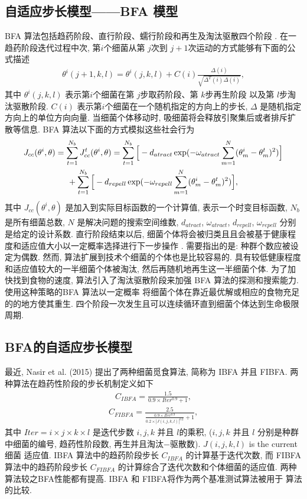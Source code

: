 \subsection{自适应步长模型——BFA 模型}\label{TPMsec1}
    BFA 算法包括趋药阶段、直行阶段、蠕行阶段和再生及淘汰驱散四个阶段 .
    在一趋药阶段迭代过程中次, 第$i$个细菌从第 $j$次到  $j+1$次运动的方式能够有下面的公式描述
\begin{align}\label{AdapchemCI}
    \theta^{i}(j+1,k,l)=\theta^{i}(j,k,l)+C(i)\frac{\Delta(i)}{\sqrt{\Delta^{T}(i)\Delta(i)}},
\end{align}
其中 $\theta^{i}(j,k,l)$ 表示第$i$个细菌在第 $j$步取药阶段、第 $k$步再生阶段 以及第 $l$步淘汰驱散阶段.
$C(i)$ 表示第$i$个细菌在一个随机指定的方向上的步长, $\Delta$ 是随机指定方向上的单位方向向量. 当细菌个体移动时, 吸细菌将会释放引聚集后或者排斥扩散等信息. BFA 算法以下面的方式模拟这些社会行为
\begin{align}
    J_{cc}&(\theta^{i}, \theta)=\sum_{t=1}^{N_b}J_{cc}^{t}(\theta^{i},\theta)
            = \sum_{t=1}^{N_b}\Big[-d_{atract}\exp(-\omega_{atract}\sum_{m=1}^{N}(\theta_{m}^{i}-\theta_{m}^{t})^2)\Big]\notag \\
&\qquad\qquad+\sum_{t=1}^{N_b}\Big[-d_{repell}\exp(-\omega_{repell}\sum_{m=1}^{N}(\theta_{m}^{i}-\theta_{m}^{t})^2)\Big],
\end{align}
其中 $J_{cc}(\theta^i,\theta)$ 是加入到实际目标函数的一个计算值, 表示一个时变目标函数, $N_b$ 是所有细菌总数, $N$ 是解决问题的搜索空间维数, $d_{atract}$, $\omega_{atract}$, $d_{repell}$, $\omega_{repell}$ 分别是给定的设计系数.
直行阶段结束以后, 细菌个体将会被归类且且会被基于健康程度和适应值大小以一定概率选择进行下一步操作 .
需要指出的是: 种群个数应被设定为偶数. 然而, 算法扩展到技术个细菌的个体也是比较容易的.
具有较低健康程度和适应值较大的一半细菌个体被淘汰, 然后再随机地再生这一半细菌个体.
为了加快找到食物的速度, 算法引入了淘汰驱散阶段来加强 BFA 算法的探测和搜索能力. 使用这种策略的BFA 算法以一定概率 将细菌个体在靠近最优解或相应的食物充足的的地方使其重生.
四个阶段一次发生且可以连续循环直到细菌个体达到生命极限周期.
\subsection{BFA的自适应步长模型}
最近, Nasir et al. (2015) 提出了两种细菌觅食算法, 简称为 IBFA 并且 FIBFA. 两种算法在趋药性阶段的步长机制定义如下
\begin{align}\label{AdapchemCIBFA}
    C_{IBFA}=\frac {1.5} {0.9\times Iter^{0.9}+1},
\end{align}
\begin{align}\label{AdapchemCF}
     C_{FIBFA}= \frac {2.5} {\frac{0.9\times Iter^{0.9}}{0.2\times|J(i,j,k,l)|^{0.2}}+1},
\end{align}
其中 $Iter=i\times j\times k\times l$ 是迭代步数 $i, j, k$ 并且 $l$的乘积, ($i, j, k$ 并且 $l$ 分别是种群中细菌的编号, 趋药性阶段数, 再生并且淘汰$-$驱散数). $J(i, j, k, l)$ is the current 细菌 适应值.
IBFA 算法中的趋药阶段步长 $C_{IBFA}$ 的计算基于迭代次数, 而 FIBFA算法中的趋药阶段步长 $C_{FIBFA}$ 的计算综合了迭代次数和个体细菌的适应值.
两种算法较之BFA性能都有提高. IBFA 和 FIBFA将作为两个基准测试算法被用于 算法的比较.
